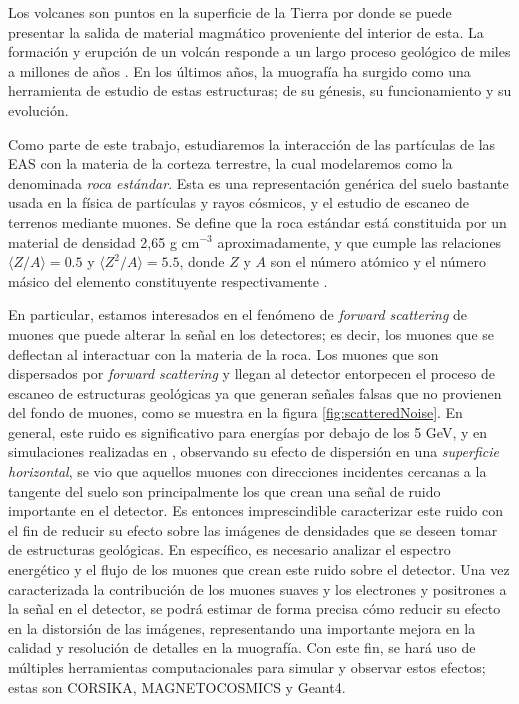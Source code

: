 \documentclass[12pt]{report}
\begin{document}
Los volcanes son puntos en la superficie de la Tierra por donde se puede presentar la salida de material magmático proveniente del interior de esta. La formación y erupción de un volcán responde a un largo proceso geológico de miles a millones de años \cite{vesga2018inversion}. En los últimos años, la muografía ha surgido como una herramienta de estudio de estas estructuras; de su génesis, su funcionamiento y su evolución.

Como parte de este trabajo, estudiaremos la interacción de las partículas de las EAS con la materia de la corteza terrestre, la cual modelaremos como la denominada \textit{roca estándar}. Esta es una representación genérica del suelo bastante usada en la física de partículas y rayos cósmicos, y el estudio de escaneo de terrenos mediante muones. Se define que la roca estándar está constituida por un material de densidad 2,65 g cm$^{-3}$ aproximadamente, y que cumple las relaciones $\langle Z/A \rangle=0.5$ y $\langle Z^2/A \rangle=5.5$, donde $Z$ y $A$ son el número atómico y el número másico del elemento constituyente respectivamente \cite{groom2001muon}.

En particular, estamos interesados en el fenómeno de \textit{forward scattering} de muones que puede alterar la señal en los detectores; es decir, los muones que se deflectan al interactuar con la materia de la roca. Los muones que son dispersados por \textit{forward scattering} y llegan al detector entorpecen el proceso de escaneo de estructuras geológicas ya que generan señales falsas que no provienen del fondo de muones, como se muestra en la figura \ref{fig:scatteredNoise}. En general, este ruido es significativo para energías por debajo de los 5 GeV, y en simulaciones realizadas en \cite{gomez2017forward}, observando su efecto de dispersión en una \textit{superficie horizontal}, se vio que aquellos muones con direcciones incidentes cercanas a la tangente del suelo son principalmente los que crean una señal de ruido importante en el detector. Es entonces imprescindible caracterizar este ruido con el fin de reducir su efecto sobre las imágenes de densidades que se deseen tomar de estructuras geológicas. En específico, es necesario analizar el espectro energético y el flujo de los muones que crean este ruido sobre el detector. Una vez caracterizada la contribución de los muones suaves y los electrones y positrones a la señal en el detector, se podrá estimar de forma precisa cómo reducir su efecto en la distorsión de las imágenes, representando una importante mejora en la calidad y resolución de detalles en la muografía. Con este fin, se hará uso de múltiples herramientas computacionales para simular y observar estos efectos; estas son CORSIKA, MAGNETOCOSMICS y Geant4.
\end{document}
